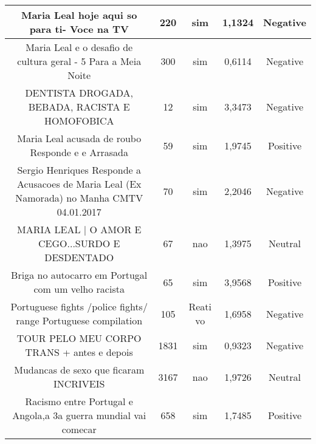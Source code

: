 \documentclass[11pt]{article}
\newlength\mylength
\begin{document}
\begin{center}
\begin{longtable}{||C{.40\mylength}||C{.20\mylength}||C{.20\mylength}||C{.30\mylength}||C{.20\mylength}||}
   Maria Leal hoje aqui so para ti- Voce na TV  & 220 & sim & 1,1324 & Negative \\  \hline
   Maria Leal e o desafio de cultura geral - 5 Para a Meia Noite  & 300 & sim & 0,6114 & Negative \\  \hline
   DENTISTA DROGADA, BEBADA, RACISTA E HOMOFOBICA  & 12 & sim & 3,3473 & Negative \\  \hline
   Maria Leal acusada de roubo Responde e e Arrasada  & 59 & sim & 1,9745 & Positive \\  \hline
   Sergio Henriques Responde a Acusacoes de Maria Leal (Ex Namorada) no Manha CMTV 04.01.2017  & 70 & sim & 2,2046 & Negative \\  \hline
   MARIA LEAL | O AMOR E CEGO...SURDO E DESDENTADO  & 67 & nao & 1,3975 & Neutral \\  \hline
   Briga no autocarro em Portugal com um velho racista  & 65 & sim & 3,9568 & Positive \\  \hline
  Portuguese fights /police fights/ range Portuguese compilation  & 105 & Reati  vo & 1,6958 & Negative \\  \hline
   TOUR PELO MEU CORPO TRANS + antes e depois  & 1831 & sim & 0,9323 & Negative \\  \hline
   Mudancas de sexo que ficaram INCRIVEIS  & 3167 & nao & 1,9726 & Neutral \\  \hline
   Racismo entre Portugal e Angola,a 3a guerra mundial vai comecar  & 658 & sim & 1,7485 & Positive \\  \hline

\end{longtable}
\end{center}
\end{document}
